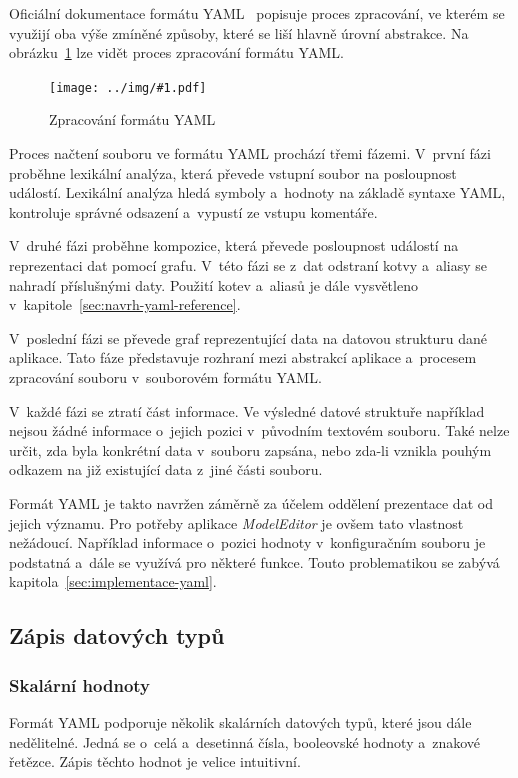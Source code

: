 \documentclass[FM,bw,DP]{tulthesis}
\newcommand{\includeimg}[2]{%
\begin{figure}[h]
	\centering
    \texttt{[image: ../img/\#1.pdf]}
    \caption{#2}
	\label{img:#1}
\end{figure}
}
\begin{document}
Oficiální dokumentace formátu \gls{YAML}~\cite{bib:yaml} popisuje proces zpracování, ve kterém se využijí oba výše zmíněné způsoby, které se liší hlavně úrovní abstrakce. Na obrázku~\ref{img:yaml} lze vidět proces zpracování formátu \gls{YAML}.

\includeimg{yaml}{Zpracování formátu YAML}

Proces načtení souboru ve formátu \gls{YAML} prochází třemi fázemi. V~první fázi proběhne lexikální analýza, která převede vstupní soubor na posloupnost událostí. Lexikální analýza hledá symboly a~hodnoty na základě syntaxe \gls{YAML}, kontroluje správné odsazení a~vypustí ze vstupu komentáře.

V~druhé fázi proběhne kompozice, která převede posloupnost událostí na reprezentaci dat pomocí grafu. V~této fázi se z~dat odstraní kotvy a~aliasy se nahradí příslušnými daty. Použití kotev a~aliasů je dále vysvětleno v~kapitole~\ref{sec:navrh-yaml-reference}.

V~poslední fázi se převede graf reprezentující data na datovou strukturu dané aplikace. Tato fáze představuje rozhraní mezi abstrakcí aplikace a~procesem zpracování souboru v~souborovém formátu \gls{YAML}.

V~každé fázi se ztratí část informace. Ve výsledné datové struktuře například nejsou žádné informace o~jejich pozici v~původním textovém souboru. Také nelze určit, zda byla konkrétní data v~souboru zapsána, nebo zda-li vznikla pouhým odkazem na již existující data z~jiné části souboru.

Formát \gls{YAML} je takto navržen záměrně za účelem oddělení prezentace dat od jejich významu. Pro potřeby aplikace \textit{ModelEditor} je ovšem tato vlastnost nežádoucí. Například informace o~pozici hodnoty v~konfiguračním souboru je podstatná a~dále se využívá pro některé funkce. Touto problematikou se zabývá kapitola~\ref{sec:implementace-yaml}.

\subsection{Zápis datových typů}
\label{sec:analyza-yaml-zapis-datovych-typu}

\subsubsection*{Skalární hodnoty}

Formát \gls{YAML} podporuje několik skalárních datových typů, které jsou dále nedělitelné. Jedná se o~celá a~desetinná čísla, booleovské hodnoty a~znakové řetězce. Zápis těchto hodnot je velice intuitivní. 
\end{document}
